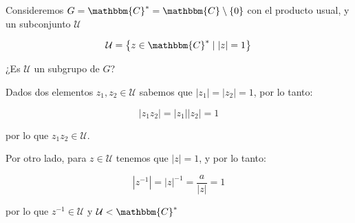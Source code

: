         \begin{ejemplo}
            Consideremos $G = \mathbbm{C}^* = \mathbbm{C} \setminus \{ 0 \}$ con el producto usual, y un subconjunto $\mathcal{U}$

            \begin{equation*}
                \mathcal{U} = \left\{ z \in \mathbbm{C}^* \mid |z| = 1 \right\}
            \end{equation*}

            ¿Es $\mathcal{U}$ un subgrupo de $G$?

            Dados dos elementos $z_1, z_2 \in \mathcal{U}$ sabemos que $|z_1| = |z_2| = 1$, por lo tanto:

            \begin{equation*}
                |z_1 z_2| = |z_1| |z_2| = 1
            \end{equation*}

            por lo que $z_1 z_2 \in \mathcal{U}$.

            Por otro lado, para $z \in \mathcal{U}$ tenemos que $|z| = 1$, y por lo tanto:

            \begin{equation*}
                |z^{-1}| = |z|^{-1} = \frac{a}{|z|} = 1
            \end{equation*}

            por lo que $z^{-1} \in \mathcal{U}$ y $\mathcal{U} < \mathbbm{C}^*$
        \end{ejemplo}

